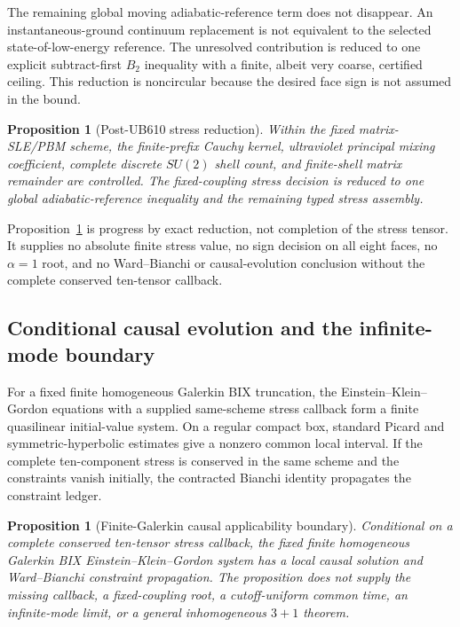 \documentclass[11pt]{article}
\newtheorem{proposition}[theorem]{Proposition}
\theoremstyle{definition}
\theoremstyle{remark}
\begin{document}
The remaining global moving adiabatic-reference term does not disappear. An instantaneous-ground continuum replacement is not equivalent to the selected state-of-low-energy reference. The unresolved contribution is reduced to one explicit subtract-first $B_2$ inequality with a finite, albeit very coarse, certified ceiling. This reduction is noncircular because the desired face sign is not assumed in the bound.

\begin{proposition}[Post-UB610 stress reduction]\label{prop:stressreduction}
Within the fixed matrix-SLE/PBM scheme, the finite-prefix Cauchy kernel, ultraviolet principal mixing coefficient, complete discrete $SU(2)$ shell count, and finite-shell matrix remainder are controlled. The fixed-coupling stress decision is reduced to one global adiabatic-reference inequality and the remaining typed stress assembly.
\end{proposition}

Proposition~\ref{prop:stressreduction} is progress by exact reduction, not completion of the stress tensor. It supplies no absolute finite stress value, no sign decision on all eight faces, no $\alpha=1$ root, and no Ward--Bianchi or causal-evolution conclusion without the complete conserved ten-tensor callback.

\subsection{Conditional causal evolution and the infinite-mode boundary}

For a fixed finite homogeneous Galerkin BIX truncation, the Einstein--Klein--Gordon equations with a supplied same-scheme stress callback form a finite quasilinear initial-value system. On a regular compact box, standard Picard and symmetric-hyperbolic estimates give a nonzero common local interval. If the complete ten-component stress is conserved in the same scheme and the constraints vanish initially, the contracted Bianchi identity propagates the constraint ledger.

\begin{proposition}[Finite-Galerkin causal applicability boundary]\label{prop:causal}
Conditional on a complete conserved ten-tensor stress callback, the fixed finite homogeneous Galerkin BIX Einstein--Klein--Gordon system has a local causal solution and Ward--Bianchi constraint propagation. The proposition does not supply the missing callback, a fixed-coupling root, a cutoff-uniform common time, an infinite-mode limit, or a general inhomogeneous $3+1$ theorem.
\end{proposition}
\end{document}
